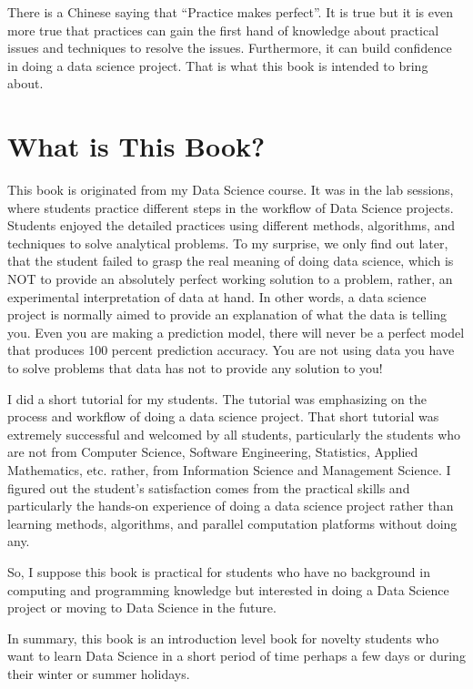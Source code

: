 \documentclass[
]{book}
\begin{document}
There is a Chinese saying that ``Practice makes perfect''. It is true but it is even more true that practices can gain the first hand of knowledge about practical issues and techniques to resolve the issues. Furthermore, it can build confidence in doing a data science project. That is what this book is intended to bring about.

\hypertarget{what-is-this-book}{%
\section*{What is This Book?}\label{what-is-this-book}}


This book is originated from my Data Science course. It was in the lab sessions, where students practice different steps in the workflow of Data Science projects. Students enjoyed the detailed practices using different methods, algorithms, and techniques to solve analytical problems. To my surprise, we only find out later, that the student failed to grasp the real meaning of doing data science, which is NOT to provide an absolutely perfect working solution to a problem, rather, an experimental interpretation of data at hand. In other words, a data science project is normally aimed to provide an explanation of what the data is telling you. Even you are making a prediction model, there will never be a perfect model that produces 100 percent prediction accuracy. You are not using data you have to solve problems that data has not to provide any solution to you!

I did a short tutorial for my students. The tutorial was emphasizing on the process and workflow of doing a data science project. That short tutorial was extremely successful and welcomed by all students, particularly the students who are not from Computer Science, Software Engineering, Statistics, Applied Mathematics, etc. rather, from Information Science and Management Science. I figured out the student's satisfaction comes from the practical skills and particularly the hands-on experience of doing a data science project rather than learning methods, algorithms, and parallel computation platforms without doing any.

So, I suppose this book is practical for students who have no background in computing and programming knowledge but interested in doing a Data Science project or moving to Data Science in the future.

In summary, this book is an introduction level book for novelty students who want to learn Data Science in a short period of time perhaps a few days or during their winter or summer holidays.
\end{document}
